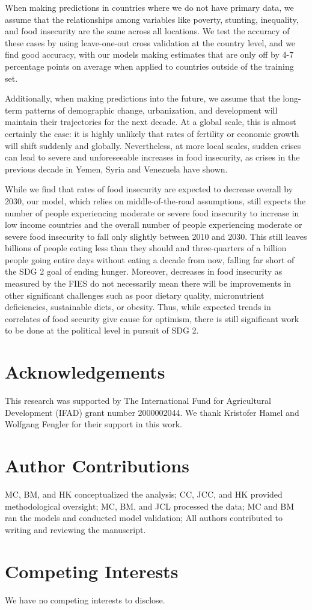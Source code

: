 \documentclass[titlepage]{article}
\begin{document}
When making predictions in countries where we do not have primary data, we assume that the relationships among variables like poverty, stunting, inequality, and food insecurity are the same across all locations.  We test the accuracy of these cases by using leave-one-out cross validation at the country level, and we find good accuracy, with our models making estimates that are only off by 4-7 percentage points on average when applied to countries outside of the training set. 

Additionally, when making predictions into the future, we assume that the long-term patterns of demographic change, urbanization, and development will maintain their trajectories for the next decade.  At a global scale, this is almost certainly the case: it is highly unlikely that rates of fertility or economic growth will shift suddenly and globally.  Nevertheless, at more local scales, sudden crises can lead to severe and unforeseeable increases in food insecurity, as crises in the previous decade in Yemen, Syria and Venezuela have shown.

While we find that rates of food insecurity are expected to decrease overall by 2030, our model, which relies on middle-of-the-road assumptions, still expects the number of people experiencing moderate or severe food insecurity to increase in low income countries and the overall number of people experiencing moderate or severe food insecurity to fall only slightly between 2010 and 2030.  This still leaves billions of people eating less than they should and three-quarters of a billion people going entire days without eating a decade from now, falling far short of the SDG 2 goal of ending hunger.  Moreover, decreases in food insecurity as measured by the FIES do not necessarily mean there will be improvements in other significant challenges such as poor dietary quality, micronutrient deficiencies, sustainable diets, or obesity.  Thus, while expected trends in correlates of food security give cause for optimism, there is still significant work to be done at the political level in pursuit of SDG 2.

\section{Acknowledgements}
This research was supported by The International Fund for Agricultural Development (IFAD) grant number 2000002044.  We thank Kristofer Hamel and Wolfgang Fengler for their support in this work.

\section{Author Contributions}
MC, BM, and HK conceptualized the analysis; CC, JCC, and HK provided methodological oversight; MC, BM, and JCL processed the data; MC and BM ran the models and conducted model validation; All authors contributed to writing and reviewing the manuscript.

\section{Competing Interests}
We have no competing interests to disclose.

\printbibliography
\end{document}
